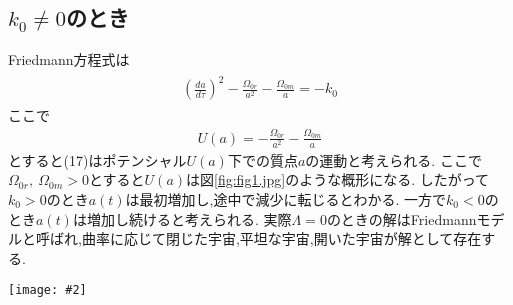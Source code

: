 \documentclass[uplatex,a4j,11pt,dvipdfmx]{jsarticle}
\makeatletter
\def\fgcaption{\def\@captype{figure}\caption}
\newcommand{\mfig}[3][width=15cm]{
\begin{center}
\texttt{[image: \#2]}
\fgcaption{#3 \label{fig:#2}}
\end{center}
}
\makeatother
\begin{document}
\subsection{$k_0\neq 0$のとき}
Friedmann方程式は
\begin{align}
  \begin{split}
    \left(\frac{da}{d\tau}\right)^2-\frac{\Omega_{0r}}{a^2}-\frac{\Omega_{0m}}{a}=-k_0
  \end{split}
\end{align}
ここで
\begin{align}
  U(a)=-\frac{\Omega_{0r}}{a^2}-\frac{\Omega_{0m}}{a}
\end{align}
とすると(17)はポテンシャル$U(a)$下での質点$a$の運動と考えられる.
ここで$\Omega_{0r},\ \Omega_{0m}>0$とすると$U(a)$は図\ref{fig:fig1.jpg}のような概形になる.
したがって$k_0>0$のとき$a(t)$は最初増加し,途中で減少に転じるとわかる.
一方で$k_0<0$のとき$a(t)$は増加し続けると考えられる.
実際$\Lambda=0$のときの解はFriedmannモデルと呼ばれ,曲率に応じて閉じた宇宙,平坦な宇宙,開いた宇宙が解として存在する.\cite{Cosmolog77:online}
\mfig[width=8cm]{fig1.jpg}{$U(a)$の概形}

\end{document}
